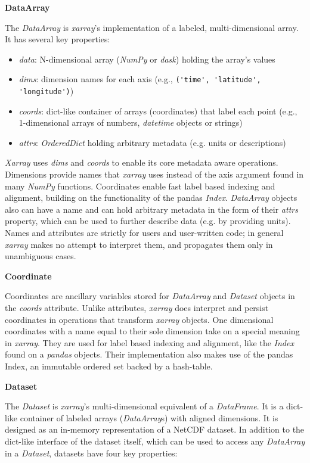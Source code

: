 \documentclass{jors}
\begin{document}
\textbf{DataArray}

The \textit{DataArray} is \textit{xarray}'s implementation of a labeled, multi-dimensional array. It has several key properties:

\begin{itemize}
	\item \textit{data}: N-dimensional array (\textit{NumPy} or \textit{dask}) holding the array’s values
	\item \textit{dims}: dimension names for each axis (e.g., \verb|('time', 'latitude', 'longitude')|)
	\item \textit{coords}: dict-like container of arrays (coordinates) that label each point (e.g., 1-dimensional arrays of numbers, \textit{datetime} objects or strings)
	\item \textit{attrs}: \textit{OrderedDict} holding arbitrary metadata (e.g. units or descriptions)
\end{itemize}

\textit{Xarray} uses \textit{dims} and \textit{coords} to enable its core metadata aware operations.
Dimensions provide names that \textit{xarray} uses instead of the axis argument found in many \textit{NumPy} functions.
Coordinates enable fast label based indexing and alignment, building on the functionality of the pandas \textit{Index}.
\textit{DataArray} objects also can have a name and can hold arbitrary metadata in the form of their \textit{attrs} property, which can be used to further describe data (e.g. by providing units).
Names and attributes are strictly for users and user-written code; in general \textit{xarray} makes no attempt to interpret them, and propagates them only in unambiguous cases.

\textbf{Coordinate}

Coordinates are ancillary variables stored for \textit{DataArray} and \textit{Dataset} objects in the \textit{coords} attribute.
Unlike attributes, \textit{xarray} does interpret and persist coordinates in operations that transform \textit{xarray} objects.
One dimensional coordinates with a name equal to their sole dimension take on a special meaning in \textit{xarray}.
They are used for label based indexing and alignment, like the \textit{Index} found on a \textit{pandas} objects.
Their implementation also makes use of the pandas Index, an immutable ordered set backed by a hash-table.

\textbf{Dataset}

The \textit{Dataset} is \textit{xarray}’s multi-dimensional equivalent of a \textit{DataFrame}. It is a dict-like container of labeled arrays (\textit{DataArray}s) with aligned dimensions.
It is designed as an in-memory representation of a NetCDF dataset.
In addition to the dict-like interface of the dataset itself, which can be used to access any \textit{DataArray} in a \textit{Dataset}, datasets have four key properties:
\end{document}
